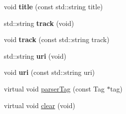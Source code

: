 \begin{DoxyCompactItemize}
\item 
\hypertarget{classTune_a7eb17264f03e39389e0fa3997fb15fd4}{
void {\bfseries title} (const std::string title)}
\label{classTune_a7eb17264f03e39389e0fa3997fb15fd4}

\item 
\hypertarget{classTune_a97fea01406b913c5e2a3bc036317babd}{
std::string {\bfseries track} (void)}
\label{classTune_a97fea01406b913c5e2a3bc036317babd}

\item 
\hypertarget{classTune_ad42e5171266e765dac1896674c1d3168}{
void {\bfseries track} (const std::string track)}
\label{classTune_ad42e5171266e765dac1896674c1d3168}

\item 
\hypertarget{classTune_a8c8d6309fed5dc9dbfa3cfdf303af7a2}{
std::string {\bfseries uri} (void)}
\label{classTune_a8c8d6309fed5dc9dbfa3cfdf303af7a2}

\item 
\hypertarget{classTune_a7f0bec17e80a61e79c40d38a84924d59}{
void {\bfseries uri} (const std::string uri)}
\label{classTune_a7f0bec17e80a61e79c40d38a84924d59}

\item 
virtual void \hyperlink{classTune_a4e47d003fec9e363b82567e4608dfa4a}{parserTag} (const Tag $\ast$tag)
\item 
virtual void \hyperlink{classTune_a73858a32b6ef862874896d398ead716a}{clear} (void)
\end{DoxyCompactItemize}
